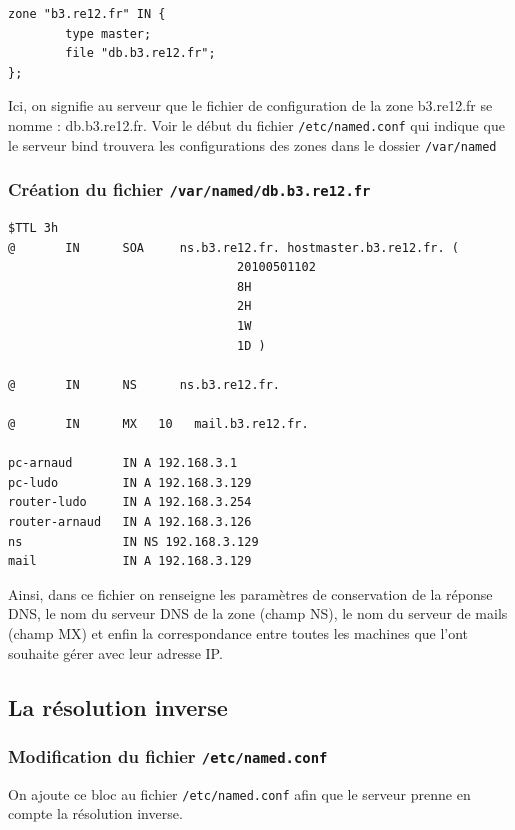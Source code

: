 \documentclass[12pt,a4paper,notitlepage]{article}
\begin{document}
\begin{lstlisting}[title=Lignes à ajouter]
zone "b3.re12.fr" IN {
        type master;
        file "db.b3.re12.fr";
};
\end{lstlisting}

Ici, on signifie au serveur que le fichier de configuration de la zone b3.re12.fr se nomme : db.b3.re12.fr. Voir le début du fichier \texttt{/etc/named.conf} qui indique que le serveur bind trouvera les configurations des zones dans le dossier \texttt{/var/named}

\subsubsection{Création du fichier \texttt{/var/named/db.b3.re12.fr}}

\begin{lstlisting}[title=Ensemble des paramètres de la zone]
$TTL 3h
@       IN      SOA     ns.b3.re12.fr. hostmaster.b3.re12.fr. (
                                20100501102
                                8H
                                2H
                                1W
                                1D )

@       IN      NS      ns.b3.re12.fr.

@       IN      MX   10   mail.b3.re12.fr.

pc-arnaud       IN A 192.168.3.1
pc-ludo         IN A 192.168.3.129
router-ludo     IN A 192.168.3.254
router-arnaud   IN A 192.168.3.126
ns              IN NS 192.168.3.129
mail            IN A 192.168.3.129
\end{lstlisting}

Ainsi, dans ce fichier on renseigne les paramètres de conservation de la réponse DNS,  le nom du serveur DNS de la zone (champ NS), le nom du serveur de mails (champ MX) et enfin la correspondance entre toutes les machines que l'ont souhaite gérer avec leur adresse IP. 

\clearpage
\subsection{La résolution inverse}

\subsubsection{Modification du fichier \texttt{/etc/named.conf}}

On ajoute ce bloc au fichier \texttt{/etc/named.conf} afin que le serveur prenne en compte la résolution inverse.
\end{document}
